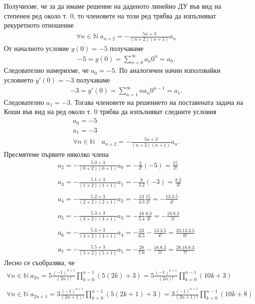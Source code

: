\documentclass[a4paper,14pt]{extarticle}
\newcommand{\N}{\mathbb{N}}
\begin{document}
Получихме, че за да имаме решение на даденото линейно ДУ във вид на степенен ред около т. $0$,
то членовете на този ред трябва да изпълняват рекуретното отношение
\begin{align*}
    \forall n \in \N \; a_{n + 2} = -\frac{5n + 3}{(n + 2) (n + 1)}a_n
\end{align*}
От началното условие $y(0) = -5$ получаваме
\begin{align*}
    -5 = y(0) = \displaystyle\sum_{n = 0}^\infty a_n 0^n = a_0.
\end{align*}
Следователно намерихме, че $a_0 = -5$. По аналогичен начин използвайки условието $y'(0) = -3$ получаваме
\begin{align*}
    -3 = y'(0) = \displaystyle\sum_{n = 1}^\infty n a_n 0^{n - 1} = a_1.
\end{align*}
Следователно $a_1 = -3$. Тогава членовете на решението на поставената задача на Коши във вид на ред около т. $0$
трябва да изпълняват следните условия
\begin{align*}
    a_0 = -5 \\
    a_1 = -3 \\
    \forall n \in \N \quad a_{n + 2} = -\frac{5n + 3}{(n + 2) (n + 1)}a_n.
\end{align*}
Пресмятеме първите няколко члена
\begin{align*}
    a_2 = -\frac{5.0 + 3}{(0 + 2)(0 + 1)}a_0 = -\frac{3}{2!}(-5) = \frac{15}{2!} \\\\
    a_3 = -\frac{5.1 + 3}{(1 + 2)(1 + 1)}a_1 = -\frac{8}{3.2}(-3) = \frac{8.3}{3!} \\\\
    a_4 = -\frac{5.2 + 3}{(2 + 2)(2 + 1)}a_2 = -\frac{13}{4.3}\frac{15}{2!} = -\frac{13.3.5}{4!} \\\\
    a_5 = -\frac{5.3 + 3}{(3 + 2)(3 + 1)}a_3 = -\frac{18}{5.4}\frac{8.3}{3!} = -\frac{18.8.3}{5!} \\\\
    a_6 = -\frac{5.4 + 3}{(4 + 2)(4 + 1)}a_4 = -\frac{23}{6.5}-\frac{13.3.5}{4!} = \frac{23.13.3.5}{6!} \\\\
    a_7 = -\frac{5.5 + 3}{(5 + 2)(5 + 1)}a_5 = -\frac{28}{7.6}-\frac{18.8.3}{5!} = \frac{28.18.8.3}{7!}
\end{align*}
Лесно се съобразява, че
\begin{align*}
    \forall n \in \N \; a_{2n} = 5\frac{(-1)^{n + 1}}{(2n)!}\displaystyle\prod_{k = 0}^{n - 1}(5(2k) + 3) = 5\frac{(-1)^{n + 1}}{(2n)!}\displaystyle\prod_{k = 0}^{n - 1}(10k + 3) \\\\
    \forall n \in \N \; a_{2n + 1} = 3\frac{(-1)^{n + 1}}{(2n + 1)!}\displaystyle\prod_{k = 0}^{n - 1}(5(2k + 1) + 3) = 3\frac{(-1)^{n + 1}}{(2n + 1)!}\displaystyle\prod_{k = 0}^{n - 1}(10k + 8)
\end{align*}
\end{document}
